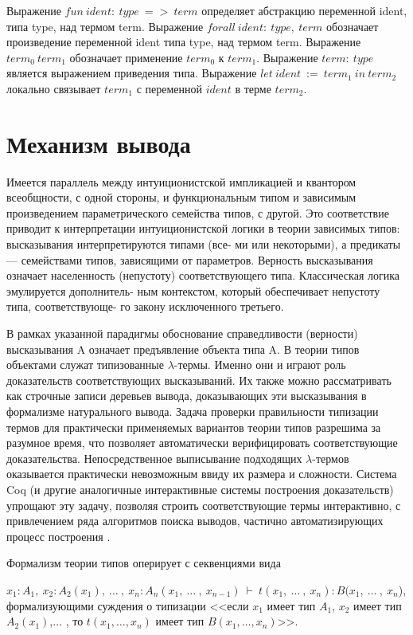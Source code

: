 Выражение $fun \ ident: \ type \ => \ term$ определяет абстракцию переменной 
ident, типа type, над термом term. Выражение $forall \ ident: \ type, \ term$ 
обозначает произведение переменной ident типа type, над термом term. 
Выражение $term_{0} \ term_{1}$ обозначает применение $term_{0}$ к $term_{1}$.
Выражение $term: \ type$ является выражением приведения типа. Выражение $let 
\ ident \ := \ term_{1} \ in \ term_{2}$ локально связывает $term_{1}$ с 
переменной  $ident$ в терме $term_{2}$.
  
	
\section{Механизм вывода}

Имеется параллель между интуиционистской импликацией и квантором
всеобщности, с одной стороны, и функциональным типом и зависимым
произведением параметрического семейства типов, с другой.
Это соответствие приводит к интерпретации интуиционистской логики в
теории зависимых типов: высказывания интерпретируются типами (все-
ми или некоторыми), а предикаты --- семействами типов, зависящими от
параметров. Верность высказывания означает населенность (непустоту)
соответствующего типа. Классическая логика эмулируется дополнитель-
ным контекстом, который обеспечивает непустоту типа, соответствующе-
го закону исключенного третьего\cite{msu}.

В рамках указанной парадигмы обоснование справедливости (верности) 
высказывания A означает предъявление объекта типа A. В теории типов объектами 
служат типизованные $\lambda$-термы. Именно они и играют роль доказательств 
соответствующих высказываний. Их также можно рассматривать как строчные 
записи деревьев вывода, доказывающих эти высказывания в формализме 
натурального вывода. Задача проверки правильности типизации термов для 
практически применяемых вариантов теории типов разрешима за разумное время, 
что позволяет автоматически верифицировать соответствующие доказательства. 
Непосредственное выписывание подходящих $\lambda$-термов оказывается 
практически невозможным ввиду их размера и сложности. Система Coq (и другие 
аналогичные интерактивные системы построения доказательств) упрощают эту 
задачу, позволяя строить соответствующие термы интерактивно, с привлечением 
ряда алгоритмов поиска выводов, частично автоматизирующих процесс построения \cite{msu}.


Формализм теории типов оперирует с секвенциями вида

$x_{1}:A_{1}, \ x_{2}:A_{2}(x_{1}), \  \ldots \ , \  x_{n}:A_{n}(x_{1}, \ 
\ldots \ , \ x_{n−1}) \ \vdash \  t(x_{1}, \ \ldots \ , \ x_{n}):B(x_{1}, \ 
\ldots \ , \ x_{n}$),
формализующими суждения о типизации <<если $x_{1}$ имеет тип $A_{1}$, $x_{2}$ 
имеет тип $A_{2}(x_{1})$,$\ldots$ , то $t(x_{1}, \ldots , x_{n})$ имеет тип $B
(x_{1}, \ldots , x_{n})$>>.

